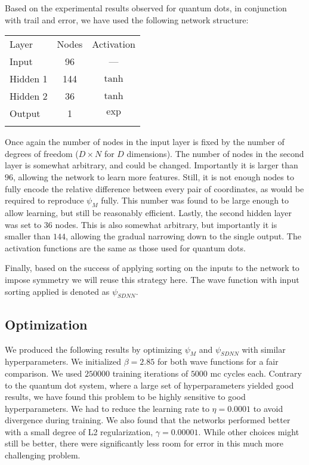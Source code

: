 \documentclass[Thesis.tex]{subfiles}
\begin{document}
Based on the experimental results observed for quantum dots, in conjunction with
trail and error, we have used the following network structure:

\begin{center}
  \begin{tabular}{lcc}
    \toprule
    \addlinespace
    Layer & Nodes & Activation\\
    \addlinespace
    \midrule
    \addlinespace
    \addlinespace
    Input & 96 & ---\\
    Hidden 1& 144 & $\tanh$\\
    Hidden 2& 36 & $\tanh$\\
    Output & 1 & $\exp$\\
    \addlinespace
    \addlinespace
    \bottomrule
  \end{tabular}
\end{center}
Once again the number of nodes in the input layer is fixed by the number of
degrees of freedom ($D\times N$ for $D$ dimensions). The number of nodes in the
second layer is somewhat arbitrary, and could be changed. Importantly it is
larger than $96$, allowing the network to learn more features. Still, it is not
enough nodes to fully encode the relative difference between every pair of
coordinates, as would be required to reproduce $\psi_M$ fully. This number was
found to be large enough to allow learning, but still be reasonably efficient.
Lastly, the second hidden layer was set to $36$ nodes. This is also somewhat
arbitrary, but importantly it is smaller than $144$, allowing the gradual
narrowing down to the single output. The activation functions are the same as
those used for quantum dots.

Finally, based on the success of applying sorting on the inputs to the network
to impose symmetry we will reuse this strategy here. The wave function with
input sorting applied is denoted as $\psi_{SDNN}$.

\subsection{Optimization}

We produced the following results by optimizing $\psi_M$ and $\psi_{SDNN}$ with
similar hyperparameters. We initialized $\beta=\num{2.85}$ for both wave functions
for a fair comparison. We used $\num{250000}$ training iterations of
$\num{5000}$ \gls{mc} cycles each. Contrary to the quantum dot system, where a large
set of hyperparameters yielded good results, we have found this problem to be
highly sensitive to good hyperparameters. We had to reduce the learning rate to
$\eta=\num{0.0001}$ to avoid divergence during training. We also found that the
networks performed better with a small degree of L2 regularization,
$\gamma=\num{0.00001}$. While other choices might still be better, there were
significantly less room for error in this much more challenging problem.
\end{document}
